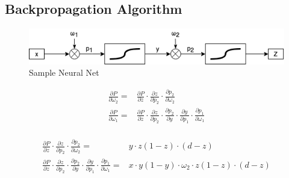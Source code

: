 \documentclass[12pt]{book}
\begin{document}
\subsection{Backpropagation Algorithm}
\begin{figure}[ht]
	\centering
	\includegraphics[scale=0.7]{Figure/Figure12_6.png}
	\caption{Sample Neural Net}
\end{figure}
\begin{equation*}
\begin{aligned}
	\frac{\partial P}{\partial \omega_2} = &\frac{\partial P}{\partial z}\cdot \frac{\partial z}{\partial p_2}\cdot \frac{\partial p_2}{\partial \omega_2}\\
	\frac{\partial P}{\partial \omega_1} = &\frac{\partial P}{\partial z}\cdot \frac{\partial z}{\partial p_2}\cdot \frac{\partial p_2}{\partial y}\cdot \frac{\partial y}{\partial p_1}\cdot\frac{\partial p_1}{\partial \omega_1}\\
\end{aligned}
\end{equation*}

\begin{equation*}
\begin{aligned}
	\frac{\partial P}{\partial z}\cdot \frac{\partial z}{\partial p_2}\cdot \frac{\partial p_2}{\partial \omega_2}=&y\cdot z(1-z)\cdot(d-z)\\
	\frac{\partial P}{\partial z}\cdot \frac{\partial z}{\partial p_2}\cdot \frac{\partial p_2}{\partial y}\cdot \frac{\partial y}{\partial p_1}\cdot\frac{\partial p_1}{\partial \omega_1}=&x\cdot y(1-y)\cdot \omega_2\cdot z(1-z)\cdot(d-z)
\end{aligned}
\end{equation*}
\newpage
\end{document}
